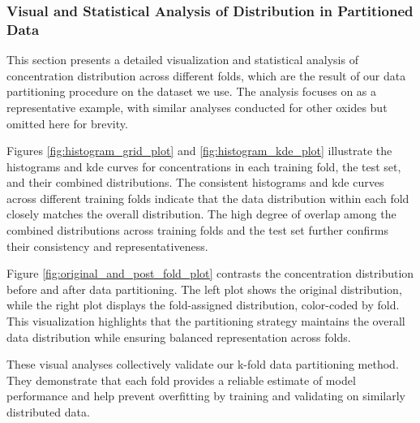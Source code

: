\subsubsection{Visual and Statistical Analysis of  Distribution in Partitioned Data}\label{sec:visual_analysis}
This section presents a detailed visualization and statistical analysis of  concentration distribution across different folds, which are the result of our data partitioning procedure on the dataset we use.
The analysis focuses on  as a representative example, with similar analyses conducted for other oxides but omitted here for brevity.

Figures \ref{fig:histogram_grid_plot} and \ref{fig:histogram_kde_plot} illustrate the histograms and \gls{kde} curves for  concentrations in each training fold, the test set, and their combined distributions.
The consistent histograms and \gls{kde} curves across different training folds indicate that the data distribution within each fold closely matches the overall distribution.
The high degree of overlap among the combined distributions across training folds and the test set further confirms their consistency and representativeness.

Figure \ref{fig:original_and_post_fold_plot} contrasts the  concentration distribution before and after data partitioning.
The left plot shows the original distribution, while the right plot displays the fold-assigned distribution, color-coded by fold.
This visualization highlights that the partitioning strategy maintains the overall data distribution while ensuring balanced representation across folds.

These visual analyses collectively validate our k-fold data partitioning method.
They demonstrate that each fold provides a reliable estimate of model performance and help prevent overfitting by training and validating on similarly distributed data.

